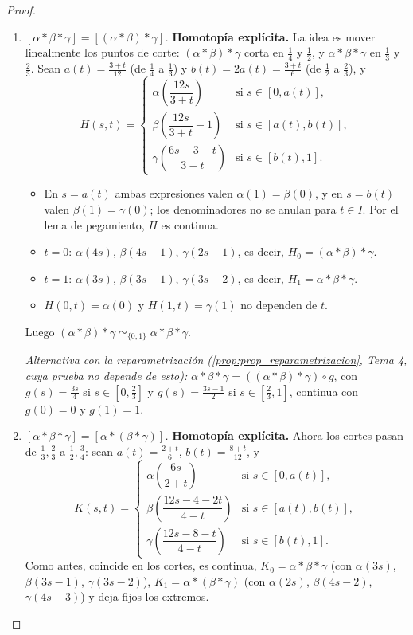 \begin{proof}
\begin{enumerate}
    \item \emph{$[\alpha * \beta * \gamma] = [(\alpha * \beta) * \gamma]$.} \textbf{Homotopía explícita.} La idea es mover linealmente los puntos de corte: $(\alpha * \beta) * \gamma$ corta en $\frac14$ y $\frac12$, y $\alpha * \beta * \gamma$ en $\frac13$ y $\frac23$. Sean $a(t) = \frac{3+t}{12}$ (de $\frac14$ a $\frac13$) y $b(t) = 2a(t) = \frac{3+t}{6}$ (de $\frac12$ a $\frac23$), y
    \[ H(s,t) = \begin{cases} \alpha\left( \dfrac{12s}{3+t} \right) & \text{si } s \in [0, a(t)], \\[2ex] \beta\left( \dfrac{12s}{3+t} - 1 \right) & \text{si } s \in [a(t), b(t)], \\[2ex] \gamma\left( \dfrac{6s - 3 - t}{3 - t} \right) & \text{si } s \in [b(t), 1]. \end{cases} \]
    \begin{itemize}
        \item En $s = a(t)$ ambas expresiones valen $\alpha(1) = \beta(0)$, y en $s = b(t)$ valen $\beta(1) = \gamma(0)$; los denominadores no se anulan para $t \in I$. Por el lema de pegamiento, $H$ es continua.
        \item $t = 0$: $\alpha(4s)$, $\beta(4s-1)$, $\gamma(2s-1)$, es decir, $H_0 = (\alpha * \beta) * \gamma$.
        \item $t = 1$: $\alpha(3s)$, $\beta(3s-1)$, $\gamma(3s-2)$, es decir, $H_1 = \alpha * \beta * \gamma$.
        \item $H(0,t) = \alpha(0)$ y $H(1,t) = \gamma(1)$ no dependen de $t$.
    \end{itemize}
    Luego $(\alpha * \beta) * \gamma \simeq_{\{0,1\}} \alpha * \beta * \gamma$.

    \emph{Alternativa con la reparametrización (\cref{prop:prop_reparametrizacion}, Tema 4, cuya prueba no depende de esto):} $\alpha * \beta * \gamma = ((\alpha * \beta) * \gamma) \circ g$, con $g(s) = \frac{3s}{4}$ si $s \in [0,\frac23]$ y $g(s) = \frac{3s-1}{2}$ si $s \in [\frac23,1]$, continua con $g(0) = 0$ y $g(1) = 1$.
    \item \emph{$[\alpha * \beta * \gamma] = [\alpha * (\beta * \gamma)]$.} \textbf{Homotopía explícita.} Ahora los cortes pasan de $\frac13, \frac23$ a $\frac12, \frac34$: sean $a(t) = \frac{2+t}{6}$, $b(t) = \frac{8+t}{12}$, y
    \[ K(s,t) = \begin{cases} \alpha\left( \dfrac{6s}{2+t} \right) & \text{si } s \in [0, a(t)], \\[2ex] \beta\left( \dfrac{12s - 4 - 2t}{4 - t} \right) & \text{si } s \in [a(t), b(t)], \\[2ex] \gamma\left( \dfrac{12s - 8 - t}{4 - t} \right) & \text{si } s \in [b(t), 1]. \end{cases} \]
    Como antes, coincide en los cortes, es continua, $K_0 = \alpha * \beta * \gamma$ (con $\alpha(3s)$, $\beta(3s-1)$, $\gamma(3s-2)$), $K_1 = \alpha * (\beta * \gamma)$ (con $\alpha(2s)$, $\beta(4s-2)$, $\gamma(4s-3)$) y deja fijos los extremos.


\end{enumerate}
\end{proof}
